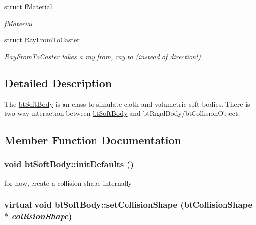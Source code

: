\begin{CompactItemize}
struct \hyperlink{structbt_soft_body_1_1f_material}{fMaterial}
\begin{CompactList}\small\item\em \hyperlink{structbt_soft_body_1_1f_material}{fMaterial} \item\end{CompactList}\item 
struct \hyperlink{structbt_soft_body_1_1_ray_from_to_caster}{RayFromToCaster}
\begin{CompactList}\small\item\em \hyperlink{structbt_soft_body_1_1_ray_from_to_caster}{RayFromToCaster} takes a ray from, ray to (instead of direction!). \item\end{CompactList}\end{CompactItemize}


\subsection{Detailed Description}
The \hyperlink{classbt_soft_body}{btSoftBody} is an class to simulate cloth and volumetric soft bodies. There is two-way interaction between \hyperlink{classbt_soft_body}{btSoftBody} and btRigidBody/btCollisionObject. 

\subsection{Member Function Documentation}
\hypertarget{classbt_soft_body_e07c09d9c2937897c3690c1a3970bf61}{
\subsubsection[initDefaults]{\setlength{\rightskip}{0pt plus 5cm}void btSoftBody::initDefaults ()}}
\label{classbt_soft_body_e07c09d9c2937897c3690c1a3970bf61}




for now, create a collision shape internally \hypertarget{classbt_soft_body_ced0f5421eeb1491a3fd77bb91e2e5af}{
\subsubsection[setCollisionShape]{\setlength{\rightskip}{0pt plus 5cm}virtual void btSoftBody::setCollisionShape (btCollisionShape $\ast$ {\em collisionShape})}}
\label{classbt_soft_body_ced0f5421eeb1491a3fd77bb91e2e5af}


